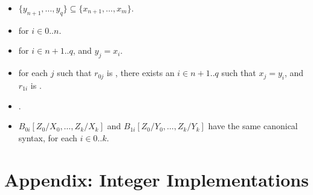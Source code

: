 \documentclass[makeidx]{article}
\begin{document}
\begin{itemize}
  \begin{itemize}
  \item
    $\{ y_{n+1}, \ldots, y_q \} \subseteq \{ x_{n+1}, \ldots , x_m \}$.
  \item
    for $i \in 0 .. n$.
  \item {}
    for $i \in n+1 .. q$, and $y_j = x_i$.
  \item
    for each $j$ such that $r_{0j}$ is \REQUIRED, there exists an
    $i \in n+1 .. q$ such that $x_j = y_i$, and $r_{1i}$ is \REQUIRED.
  \item
    .
  \item
    $B_{0i}[Z_0/X_0, \ldots, Z_k/X_k]$ and $B_{1i}[Z_0/Y_0, \ldots, Z_k/Y_k]$
    have the same canonical syntax,
    for each $i \in 0 .. k$.
  \end{itemize}

\end{itemize}


\section*{Appendix: Integer Implementations}
\end{document}
